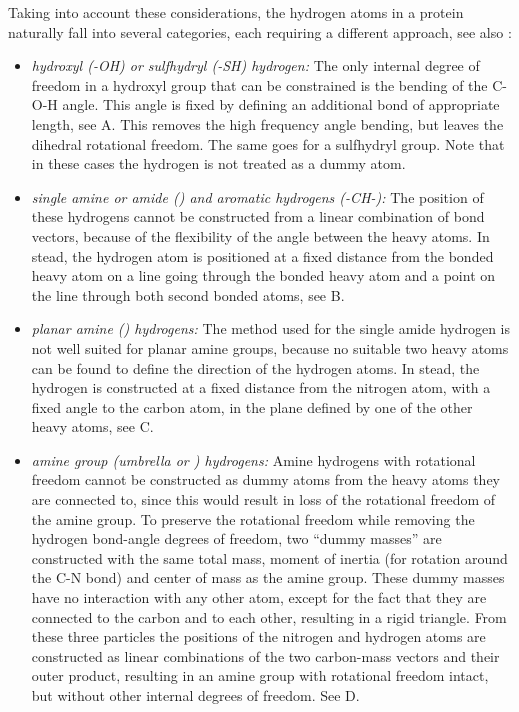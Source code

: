 Taking into account these considerations, the hydrogen atoms in a
protein naturally fall into several categories, each requiring a
different approach, see also :

\begin{itemize}

\item{\em hydroxyl ({\sf -OH}) or sulfhydryl ({\sf -SH})
hydrogen:\/} The only internal degree of freedom in a hydroxyl group
that can be constrained is the bending of the {\sf C-O-H} angle. This
angle is fixed by defining an additional bond of appropriate length,
see A. This removes the high frequency angle bending,
but leaves the dihedral rotational freedom. The same goes for a
sulfhydryl group. Note that in these cases the hydrogen is not treated
as a dummy atom.

\item{\em single amine or amide ({\amines}) and aromatic hydrogens
({\sf -CH-}):\/} The position of these hydrogens cannot be constructed
from a linear combination of bond vectors, because of the flexibility
of the angle between the heavy atoms. In stead, the hydrogen atom is
positioned at a fixed distance from the bonded heavy atom on a line
going through the bonded heavy atom and a point on the line through
both second bonded atoms, see B.

\item{\em planar amine ({\amine}) hydrogens:\/} The method used for
the single amide hydrogen is not well suited for planar amine groups,
because no suitable two heavy atoms can be found to define the
direction of the hydrogen atoms. In stead, the hydrogen is constructed
at a fixed distance from the nitrogen atom, with a fixed angle to the
carbon atom, in the plane defined by one of the other heavy atoms, see
C.

\item{\em amine group (umbrella {\amine} or {\aminep}) hydrogens:\/}
Amine hydrogens with rotational freedom cannot be constructed as dummy
atoms from the heavy atoms they are connected to, since this would
result in loss of the rotational freedom of the amine group. To
preserve the rotational freedom while removing the hydrogen bond-angle
degrees of freedom, two ``dummy masses'' are constructed with the same
total mass, moment of inertia (for rotation around the {\sf C-N} bond)
and center of mass as the amine group. These dummy masses have no
interaction with any other atom, except for the fact that they are
connected to the carbon and to each other, resulting in a rigid
triangle. From these three particles the positions of the nitrogen and
hydrogen atoms are constructed as linear combinations of the two
carbon-mass vectors and their outer product, resulting in an amine
group with rotational freedom intact, but without other internal
degrees of freedom. See D.

\end{itemize}

